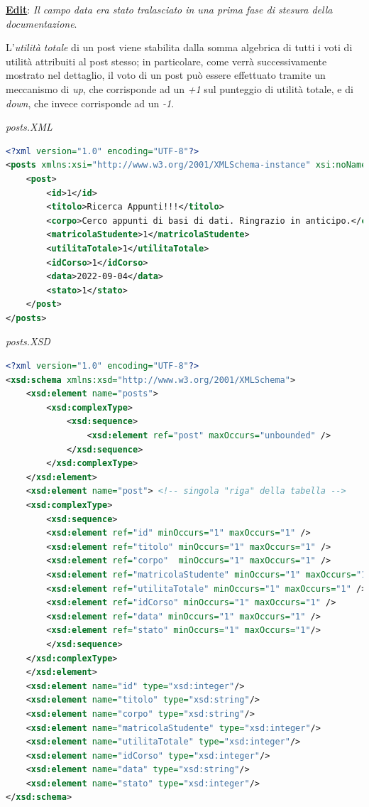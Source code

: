 \documentclass [a4paper,11pt]{book}
\begin{document}
\textbf{\underline{Edit}}: \emph{Il campo data era stato tralasciato in una prima fase di stesura della documentazione}.

L'\emph{utilità totale} di un post viene stabilita dalla somma algebrica di tutti i voti di utilità attribuiti al post stesso; in particolare, come verrà successivamente mostrato nel dettaglio, il voto di un post può essere effettuato tramite un meccanismo di \emph{up}, che corrisponde ad un \emph{+1} sul punteggio di utilità totale, e di \emph{down}, che invece corrisponde ad un \emph{-1}.

\medskip

\emph{posts.XML}

\label{sec:posts}

\begin{lstlisting}[language=XML]
<?xml version="1.0" encoding="UTF-8"?>
<posts xmlns:xsi="http://www.w3.org/2001/XMLSchema-instance" xsi:noNamespaceSchemaLocation="posts.xsd">
    <post>
        <id>1</id>
        <titolo>Ricerca Appunti!!!</titolo>
        <corpo>Cerco appunti di basi di dati. Ringrazio in anticipo.</corpo>
        <matricolaStudente>1</matricolaStudente>
        <utilitaTotale>1</utilitaTotale>
        <idCorso>1</idCorso>
        <data>2022-09-04</data>
        <stato>1</stato>
    </post>
</posts>
\end{lstlisting}

\emph{posts.XSD}

\begin{lstlisting}[language=XML]
<?xml version="1.0" encoding="UTF-8"?>
<xsd:schema xmlns:xsd="http://www.w3.org/2001/XMLSchema">
    <xsd:element name="posts">
        <xsd:complexType>
            <xsd:sequence>
                <xsd:element ref="post" maxOccurs="unbounded" />
            </xsd:sequence>
        </xsd:complexType>
    </xsd:element>
    <xsd:element name="post"> <!-- singola "riga" della tabella -->
    <xsd:complexType>
        <xsd:sequence>
        <xsd:element ref="id" minOccurs="1" maxOccurs="1" />
        <xsd:element ref="titolo" minOccurs="1" maxOccurs="1" />
        <xsd:element ref="corpo"  minOccurs="1" maxOccurs="1" />
        <xsd:element ref="matricolaStudente" minOccurs="1" maxOccurs="1" />
        <xsd:element ref="utilitaTotale" minOccurs="1" maxOccurs="1" />
        <xsd:element ref="idCorso" minOccurs="1" maxOccurs="1" />
        <xsd:element ref="data" minOccurs="1" maxOccurs="1" />
        <xsd:element ref="stato" minOccurs="1" maxOccurs="1"/>
        </xsd:sequence>   
    </xsd:complexType>
    </xsd:element>
    <xsd:element name="id" type="xsd:integer"/>
    <xsd:element name="titolo" type="xsd:string"/>
    <xsd:element name="corpo" type="xsd:string"/>
    <xsd:element name="matricolaStudente" type="xsd:integer"/>
    <xsd:element name="utilitaTotale" type="xsd:integer"/>
    <xsd:element name="idCorso" type="xsd:integer"/>
    <xsd:element name="data" type="xsd:string"/>
    <xsd:element name="stato" type="xsd:integer"/>
</xsd:schema>
\end{lstlisting}
\end{document}
